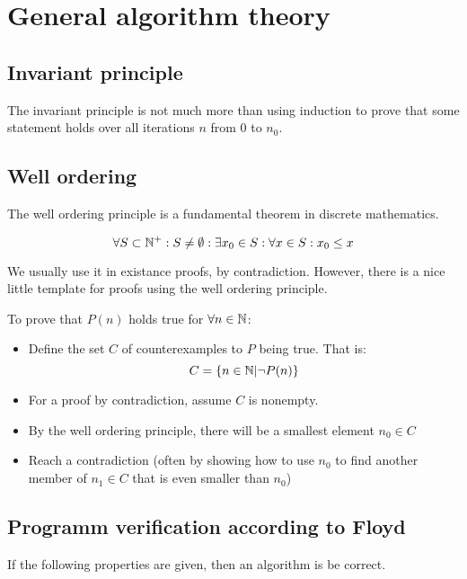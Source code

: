 \section{General algorithm theory}

\subsection{Invariant principle}

The invariant principle is not much more than using induction to prove that some statement holds over all iterations $n$ from $0$ to $n_0$.


\subsection{Well ordering}

The well ordering principle is a fundamental theorem in discrete mathematics. 

$$ \forall S \subset \mathbb{N}^+: S \neq \emptyset : \exists x_0 \in S: \forall x \in S: x_0 \leq x $$

We usually use it in existance proofs, by contradiction. However, there is a nice little template for proofs using the well ordering principle.

To prove that $P(n)$ holds true for $\forall n \in \mathbb{N}$:

\begin{itemize}
    \item Define the set $C$ of counterexamples to $P$ being true. That is: 
    $$ C = \{ n \in \mathbb{N} | \lnot P(n) \}$$
    
    \item For a proof by contradiction, assume $C$ is nonempty.
    
    \item By the well ordering principle, there will be a smallest element $n_0 \in C$
    
    \item Reach a contradiction (often by showing how to use $n_0$ to find another member of $n_1 \in C$ that is even smaller than $n_0$)
\end{itemize}


\subsection{Programm verification according to Floyd}

If the following properties are given, then an algorithm is be correct. 


